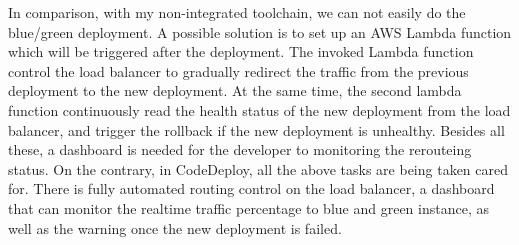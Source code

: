 \par
In comparison, with my non-integrated toolchain, we can not easily do the blue/green deployment. A possible solution is to set up an AWS Lambda function which will be triggered after the deployment. The invoked Lambda function control the load balancer to gradually redirect the traffic from the previous deployment to the new deployment. At the same time, the second lambda function continuously read the health status of the new deployment from the load balancer, and trigger the rollback if the new deployment is unhealthy. 
Besides all these, a dashboard is needed for the developer to monitoring the rerouteing status. On the contrary, in CodeDeploy, all the above tasks are being taken cared for. There is fully automated routing control on the load balancer, a dashboard that can monitor the realtime traffic percentage to blue and green instance, as well as the warning once the new deployment is failed.

